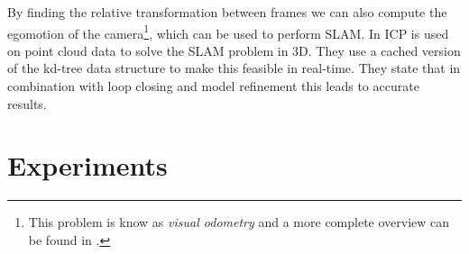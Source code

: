 \documentclass[a4paper]{article}
\begin{document}

By finding the relative transformation between frames we can also compute the egomotion of the camera\footnote{This problem is know as \emph{visual odometry} and a more complete overview can be found in \cite{scaramuzzavisual}.}, which can be used to perform \acf{SLAM}. In \cite{nuchter20076d} \ac{ICP} is used on point cloud data to solve the \ac{SLAM} problem in 3D. They use a cached version of the kd-tree data structure to make this feasible in real-time. They state that in combination with loop closing and model refinement this leads to accurate results.






\section{Experiments}
\end{document}
